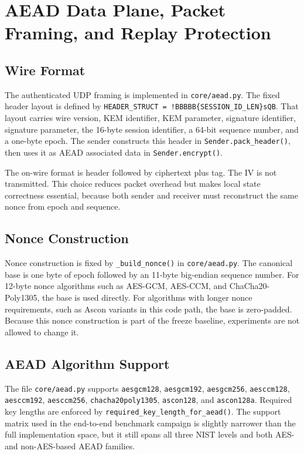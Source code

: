 \documentclass[conference]{IEEEtran}
\begin{document}
\section{AEAD Data Plane, Packet Framing, and Replay Protection}
\subsection{Wire Format}
The authenticated UDP framing is implemented in \texttt{core/aead.py}. The fixed header layout is defined by \texttt{HEADER\_STRUCT = !BBBBB\{SESSION\_ID\_LEN\}sQB}. That layout carries wire version, KEM identifier, KEM parameter, signature identifier, signature parameter, the 16-byte session identifier, a 64-bit sequence number, and a one-byte epoch. The sender constructs this header in \texttt{Sender.pack\_header()}, then uses it as AEAD associated data in \texttt{Sender.encrypt()}.

The on-wire format is header followed by ciphertext plus tag. The IV is not transmitted. This choice reduces packet overhead but makes local state correctness essential, because both sender and receiver must reconstruct the same nonce from epoch and sequence.

\subsection{Nonce Construction}
Nonce construction is fixed by \texttt{\_build\_nonce()} in \texttt{core/aead.py}. The canonical base is one byte of epoch followed by an 11-byte big-endian sequence number. For 12-byte nonce algorithms such as AES-GCM, AES-CCM, and ChaCha20-Poly1305, the base is used directly. For algorithms with longer nonce requirements, such as Ascon variants in this code path, the base is zero-padded. Because this nonce construction is part of the freeze baseline, experiments are not allowed to change it.

\subsection{AEAD Algorithm Support}
The file \texttt{core/aead.py} supports \texttt{aesgcm128}, \texttt{aesgcm192}, \texttt{aesgcm256}, \texttt{aesccm128}, \texttt{aesccm192}, \texttt{aesccm256}, \texttt{chacha20poly1305}, \texttt{ascon128}, and \texttt{ascon128a}. Required key lengths are enforced by \texttt{required\_key\_length\_for\_aead()}. The support matrix used in the end-to-end benchmark campaign is slightly narrower than the full implementation space, but it still spans all three NIST levels and both AES- and non-AES-based AEAD families.
\end{document}
